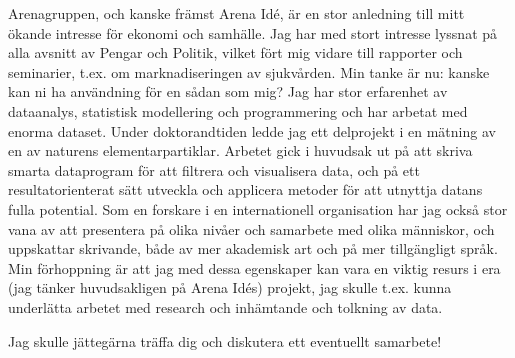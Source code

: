 \documentclass[11pt, a4paper]{../awesome-cv} %
\begin{document}
\begin{cvletter}
Arenagruppen, och kanske främst Arena Idé, är en stor anledning till mitt ökande intresse för ekonomi och samhälle. %
Jag har med stort intresse lyssnat på alla avsnitt av Pengar och Politik, vilket fört mig vidare till rapporter och seminarier, t.ex. om marknadiseringen av sjukvården. %
Min tanke är nu: kanske kan ni ha användning för en sådan som mig?
Jag har stor erfarenhet av dataanalys, statistisk modellering och programmering och har arbetat med enorma dataset.
Under doktorandtiden ledde jag ett delprojekt i en mätning av en av naturens elementarpartiklar. 
Arbetet gick i huvudsak ut på att skriva smarta dataprogram för att filtrera och visualisera data, och på ett resultatorienterat sätt utveckla och applicera metoder för att utnyttja datans fulla potential.
Som en forskare i en internationell organisation har jag också stor vana av att presentera på olika nivåer och samarbete med olika människor, och uppskattar skrivande, både av mer akademisk art och på mer tillgängligt språk.
Min förhoppning är att jag med dessa egenskaper kan vara en viktig resurs i era (jag tänker huvudsakligen på Arena Idés) projekt, jag skulle t.ex. kunna underlätta arbetet med research och inhämtande och tolkning av data. 

Jag skulle jättegärna träffa dig och diskutera ett eventuellt samarbete!

\end{cvletter}


\makeletterclosing %
\end{document}
